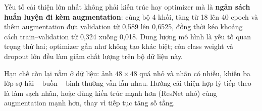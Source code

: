 \documentclass[a4paper,12pt]{article}
\begin{document}
Yếu tố cải thiện lớn nhất không phải kiến trúc hay optimizer mà là \textbf{ngân sách huấn luyện đi
kèm augmentation}: cùng bộ 4 khối, tăng từ 18 lên 40 epoch và thêm augmentation đưa validation từ
0,589 lên 0,6525, đồng thời kéo khoảng cách train--validation từ 0,324 xuống 0,018. Dung lượng mô
hình là yếu tố quan trọng thứ hai; optimizer gần như không tạo khác biệt; còn class weight và
dropout lớn đều làm giảm chất lượng trên bộ dữ liệu này.

Hạn chế còn lại nằm ở dữ liệu: ảnh $48\times48$ quá nhỏ và nhãn có nhiễu, khiến ba lớp sợ hãi --
buồn -- bình thường vẫn lẫn nhau. Hướng cải thiện hợp lý tiếp theo là làm sạch nhãn, hoặc dùng
kiến trúc mạnh hơn (ResNet nhỏ) cùng augmentation mạnh hơn, thay vì tiếp tục tăng số tầng.
\end{document}
